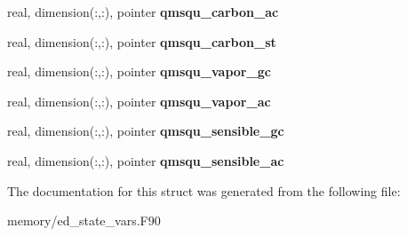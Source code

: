 \begin{DoxyCompactItemize}
\item 
\hypertarget{structed__state__vars_1_1edtype_ad0c3248f9d08ca42066aa03c1813941a}{
real, dimension(:,:), pointer {\bfseries qmsqu\_\-carbon\_\-ac}}
\label{structed__state__vars_1_1edtype_ad0c3248f9d08ca42066aa03c1813941a}

\item 
\hypertarget{structed__state__vars_1_1edtype_afd85a59bb6fbf4c5a7fc77fc58649322}{
real, dimension(:,:), pointer {\bfseries qmsqu\_\-carbon\_\-st}}
\label{structed__state__vars_1_1edtype_afd85a59bb6fbf4c5a7fc77fc58649322}

\item 
\hypertarget{structed__state__vars_1_1edtype_a6576b1be8bdcee715111976a89e690e3}{
real, dimension(:,:), pointer {\bfseries qmsqu\_\-vapor\_\-gc}}
\label{structed__state__vars_1_1edtype_a6576b1be8bdcee715111976a89e690e3}

\item 
\hypertarget{structed__state__vars_1_1edtype_ab60ae02b3b8428413f541844a5d2725c}{
real, dimension(:,:), pointer {\bfseries qmsqu\_\-vapor\_\-ac}}
\label{structed__state__vars_1_1edtype_ab60ae02b3b8428413f541844a5d2725c}

\item 
\hypertarget{structed__state__vars_1_1edtype_ad56d42766c8f828efc719ccbe14cfdd1}{
real, dimension(:,:), pointer {\bfseries qmsqu\_\-sensible\_\-gc}}
\label{structed__state__vars_1_1edtype_ad56d42766c8f828efc719ccbe14cfdd1}

\item 
\hypertarget{structed__state__vars_1_1edtype_a480e09a0a9b19ac035f047f68278bd2e}{
real, dimension(:,:), pointer {\bfseries qmsqu\_\-sensible\_\-ac}}
\label{structed__state__vars_1_1edtype_a480e09a0a9b19ac035f047f68278bd2e}

\end{DoxyCompactItemize}


The documentation for this struct was generated from the following file:\begin{DoxyCompactItemize}
\item 
memory/ed\_\-state\_\-vars.F90\end{DoxyCompactItemize}
